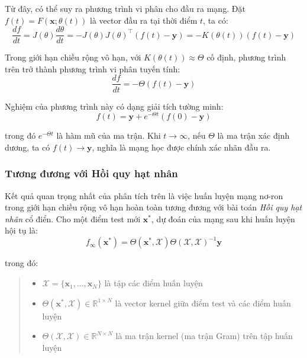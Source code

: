 Từ đây, có thể suy ra phương trình vi phân cho đầu ra mạng. Đặt $f(t) = F(\mathbf{x}; \theta(t))$ là vector đầu ra tại thời điểm $t$, ta có:
\begin{equation}
    \frac{df}{dt} = J(\theta) \frac{d\theta}{dt} = -J(\theta) J(\theta)^\top (f(t) - \mathbf{y}) = -K(\theta(t))(f(t) - \mathbf{y})
\end{equation}

Trong giới hạn chiều rộng vô hạn, với $K(\theta(t)) \approx \Theta$ cố định, phương trình trên trở thành phương trình vi phân tuyến tính:
\begin{equation}
    \frac{df}{dt} = -\Theta(f(t) - \mathbf{y})
\end{equation}

Nghiệm của phương trình này có dạng giải tích tường minh:
\begin{equation}
    f(t) = \mathbf{y} + e^{-\Theta t}(f(0) - \mathbf{y})
\end{equation}

trong đó $e^{-\Theta t}$ là hàm mũ của ma trận. Khi $t \rightarrow \infty$, nếu $\Theta$ là ma trận xác định dương, ta có $f(t) \rightarrow \mathbf{y}$, nghĩa là mạng học được chính xác nhãn đầu ra.

\subsubsection{Tương đương với Hồi quy hạt nhân}

Kết quả quan trọng nhất của phân tích trên là việc huấn luyện mạng nơ-ron trong giới hạn chiều rộng vô hạn hoàn toàn tương đương với bài toán \textit{Hồi quy hạt nhân} cổ điển. Cho một điểm test mới $\mathbf{x}^*$, dự đoán của mạng sau khi huấn luyện hội tụ là:
\begin{equation}
    f_\infty(\mathbf{x}^*) = \Theta(\mathbf{x}^*, \mathcal{X}) \Theta(\mathcal{X}, \mathcal{X})^{-1} \mathbf{y}
\end{equation}

trong đó:
\begin{quote}
\begin{itemize}
    \item $\mathcal{X} = \{\mathbf{x}_1, \ldots, \mathbf{x}_N\}$ là tập các điểm huấn luyện
    \item $\Theta(\mathbf{x}^*, \mathcal{X}) \in \mathbb{R}^{1 \times N}$ là vector kernel giữa điểm test và các điểm huấn luyện
    \item $\Theta(\mathcal{X}, \mathcal{X}) \in \mathbb{R}^{N \times N}$ là ma trận kernel (ma trận Gram) trên tập huấn luyện
\end{itemize}
\end{quote}

